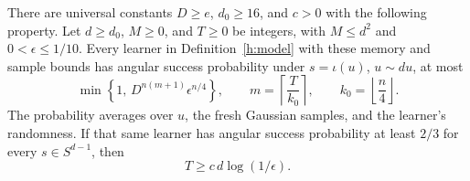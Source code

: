 \begin{proposition}
\label{h:cube:success}
There are universal constants \(D\ge e\), \(d_0\ge16\), and \(c>0\)
with the following property.  Let \(d\ge d_0\), \(M\ge0\), and \(T\ge0\)
be integers, with \(M\le d^2\) and \(0<\epsilon\le1/10\).
Every learner in Definition~\ref{h:model} with these memory and sample
bounds has angular success probability under \(s=\iota(u)\), \(u\sim du\),
at most
\begin{equation}\label{h:cube:success-bound}
 \min\left\{1,\,
       D^{n(m+1)}\epsilon^{n/4}\right\},
 \qquad
 m=\left\lceil\frac{T}{k_0}\right\rceil,\qquad
 k_0=\left\lfloor\frac n4\right\rfloor.
\end{equation}
The probability averages over \(u\), the fresh Gaussian samples, and
the learner's randomness.  If that same learner has angular success
probability at least \(2/3\) for every \(s\in S^{d-1}\), then
\begin{equation}\label{h:cube:sample-result}
 T\ge c\,d\log(1/\epsilon).
\end{equation}
\end{proposition}

